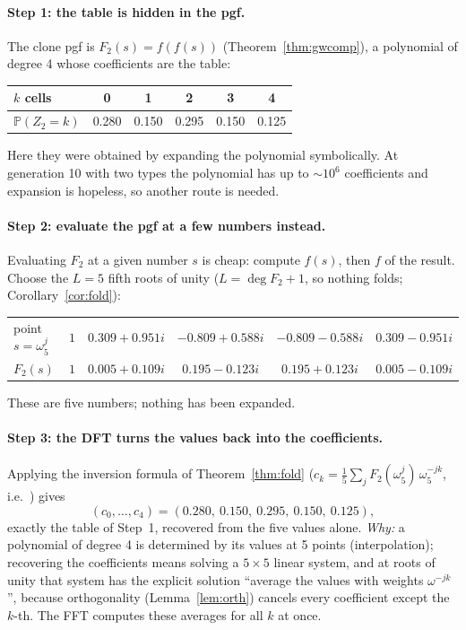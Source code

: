 \documentclass[11pt]{article}
\theoremstyle{definition}
\theoremstyle{remark}
\newcommand{\Prob}{\mathbb{P}}
\newcommand{\code}[1]{\texttt{\detokenize{#1}}}
\begin{document}
\paragraph{Step 1: the table is hidden in the pgf.} The clone pgf is $F_2(s)=f(f(s))$ (Theorem~\ref{thm:gwcomp}), a polynomial of degree 4 whose coefficients are the table:
\begin{center}\small
\begin{tabular}{@{}lccccc@{}}\toprule
$k$ cells & 0 & 1 & 2 & 3 & 4\\\midrule
$\Prob(Z_2=k)$ & 0.280 & 0.150 & 0.295 & 0.150 & 0.125\\\bottomrule
\end{tabular}
\end{center}
Here they were obtained by expanding the polynomial symbolically. At generation 10 with two types the polynomial has up to $\sim10^6$ coefficients and expansion is hopeless, so another route is needed.

\paragraph{Step 2: evaluate the pgf at a few numbers instead.} Evaluating $F_2$ at a given number $s$ is cheap: compute $f(s)$, then $f$ of the result. Choose the $L=5$ fifth roots of unity ($L=\deg F_2+1$, so nothing folds; Corollary~\ref{cor:fold}):
\begin{center}\small
\begin{tabular}{@{}lccccc@{}}\toprule
point $s=\omega_5^j$ & $1$ & $0.309+0.951i$ & $-0.809+0.588i$ & $-0.809-0.588i$ & $0.309-0.951i$\\
$F_2(s)$ & $1$ & $0.005+0.109i$ & $0.195-0.123i$ & $0.195+0.123i$ & $0.005-0.109i$\\\bottomrule
\end{tabular}
\end{center}
These are five numbers; nothing has been expanded.

\paragraph{Step 3: the DFT turns the values back into the coefficients.} Applying the inversion formula of Theorem~\ref{thm:fold} ($c_k=\frac15\sum_j F_2(\omega_5^j)\,\omega_5^{-jk}$, i.e.\ \code{np.fft.fft(values)/5}) gives
\[
(c_0,\dots,c_4)=(0.280,\ 0.150,\ 0.295,\ 0.150,\ 0.125),
\]
exactly the table of Step~1, recovered from the five values alone. \emph{Why:} a polynomial of degree 4 is determined by its values at 5 points (interpolation); recovering the coefficients means solving a $5\times5$ linear system, and at roots of unity that system has the explicit solution ``average the values with weights $\omega^{-jk}$'', because orthogonality (Lemma~\ref{lem:orth}) cancels every coefficient except the $k$-th. The FFT computes these averages for all $k$ at once.
\end{document}
